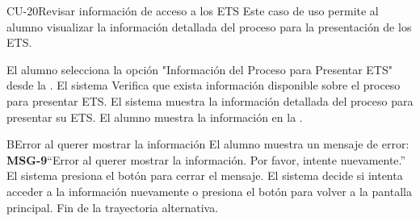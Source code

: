 
\begin{UseCase}{CU-20}{Revisar información de acceso a los ETS}{
		Este caso de uso permite al alumno visualizar la información detallada del proceso para la presentación de los ETS.
	}
\end{UseCase}
\begin{UCtrayectoria}
	\UCpaso[\UCactor] El alumno selecciona la opción "Información del Proceso para Presentar ETS" desde la .
	\UCpaso El sistema Verifica que exista información disponible sobre el proceso para presentar ETS. 
	\UCpaso El sistema muestra la información detallada del proceso para presentar su ETS.
	\UCpaso[\UCsist] El alumno muestra la información en la .
\end{UCtrayectoria}
\begin{UCtrayectoriaA}{B}{Error al querer mostrar la información}
	\UCpaso El alumno muestra un mensaje de error: {\bf MSG-9}{``Error al querer mostrar la información. Por favor, intente nuevamente.''}
	\UCpaso[\UCactor] El sistema presiona el botón  para cerrar el mensaje.
	\UCpaso[\UCactor] El sistema decide si intenta acceder a la información nuevamente o presiona el botón  para volver a la pantalla principal.
	\UCpaso Fin de la trayectoria alternativa.
\end{UCtrayectoriaA}


